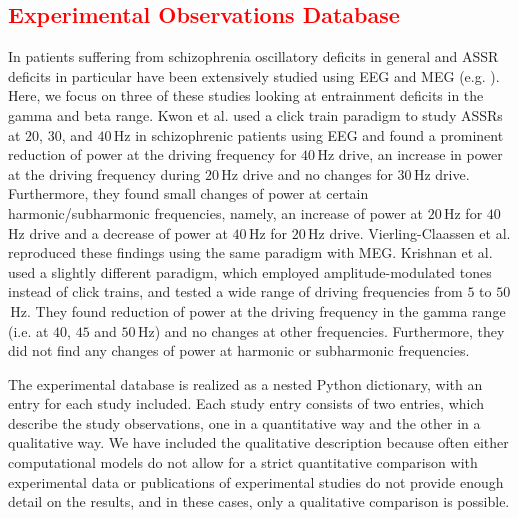 \documentclass[a4paper,10pt]{article}
\begin{document}
\subsection{\textcolor{red}{Experimental Observations Database}}

In patients suffering from schizophrenia oscillatory deficits in general and ASSR deficits in particular have been extensively studied using EEG and MEG 
(e.g.  \cite{Kwon1999,Vierling2008,Krishnan2009,
Light2006,Zhang2016,Hamm2015,Brenner2003,Spencer2009b,Spencer2008,Spencer2012,OConnell2015, Mulert2011}). Here, we focus on three of these studies looking at
entrainment deficits in the gamma and beta range. Kwon et al. \cite{Kwon1999} used a click train paradigm to study ASSRs at $20$, $30$, and $40$\,Hz in schizophrenic
patients using EEG and found a prominent reduction of power at the driving frequency for $40$\,Hz drive, an increase in power at the driving frequency during $20$\,Hz drive and 
no changes for $30$\,Hz drive. Furthermore, they found small changes of power at certain harmonic/subharmonic frequencies, namely, an increase of power at $20$\,Hz for $40$\,Hz
drive and a decrease of power at $40$\,Hz for $20$\,Hz drive. Vierling-Claassen et al. \cite{Vierling2008} reproduced these findings using the same paradigm with MEG. 
Krishnan et al. \cite{Krishnan2009} used a slightly different paradigm, which employed amplitude-modulated tones instead of click trains, and tested a wide range of driving 
frequencies from $5$ to $50$\,Hz. They found reduction of power at the driving frequency in the gamma range (i.e. at $40$, $45$ and $50$\,Hz) and no changes at other frequencies.
Furthermore, they did not find any changes of power at harmonic or subharmonic frequencies. 

The experimental database is realized as a nested Python dictionary, with an entry for each study included.
Each study entry consists of two entries, which describe the study observations, one in a quantitative way and the other in a qualitative way.
We have included the qualitative description because often either computational models do not allow for a strict quantitative comparison with 
experimental data or publications of experimental studies do not provide enough detail on the results, and in these cases, only a qualitative comparison is possible. 
\end{document}
